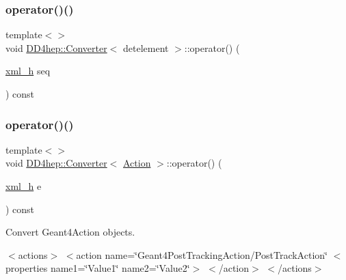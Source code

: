 \hypertarget{struct_d_d4hep_1_1_converter_a6d382f93a6ceaa0b4b6f67033a32a99d}{}\label{struct_d_d4hep_1_1_converter_a6d382f93a6ceaa0b4b6f67033a32a99d} 
\subsubsection{\texorpdfstring{operator()()}{operator()()}\hspace{0.1cm}{\footnotesize\ttfamily [11/22]}}
{\footnotesize\ttfamily template$<$$>$ \\
void \hyperlink{struct_d_d4hep_1_1_converter}{D\+D4hep\+::\+Converter}$<$ detelement $>$\+::operator() (\begin{DoxyParamCaption}\item[{\hyperlink{_det_factory_helper_8h_ac13b3c79d2bc9214ff0cf5b8dc43dda6}{xml\+\_\+h}}]{seq }\end{DoxyParamCaption}) const}

\hypertarget{struct_d_d4hep_1_1_converter_aac950482c88047edebc7e7fb56d3b04e}{}\label{struct_d_d4hep_1_1_converter_aac950482c88047edebc7e7fb56d3b04e} 
\subsubsection{\texorpdfstring{operator()()}{operator()()}\hspace{0.1cm}{\footnotesize\ttfamily [12/22]}}
{\footnotesize\ttfamily template$<$$>$ \\
void \hyperlink{struct_d_d4hep_1_1_converter}{D\+D4hep\+::\+Converter}$<$ \hyperlink{namespace_d_d4hep_1_1_simulation_1_1_setup_aa958972310161bf099d9d22e59d257ab}{Action} $>$\+::operator() (\begin{DoxyParamCaption}\item[{\hyperlink{_det_factory_helper_8h_ac13b3c79d2bc9214ff0cf5b8dc43dda6}{xml\+\_\+h}}]{e }\end{DoxyParamCaption}) const}



Convert Geant4\+Action objects. 

$<$actions$>$ $<$action name=\char`\"{}\+Geant4\+Post\+Tracking\+Action/\+Post\+Track\+Action\char`\"{} $<$properties name1=\char`\"{}\+Value1\char`\"{} name2=\char`\"{}\+Value2\char`\"{}$>$ $<$/action$>$ $<$/actions$>$ 

